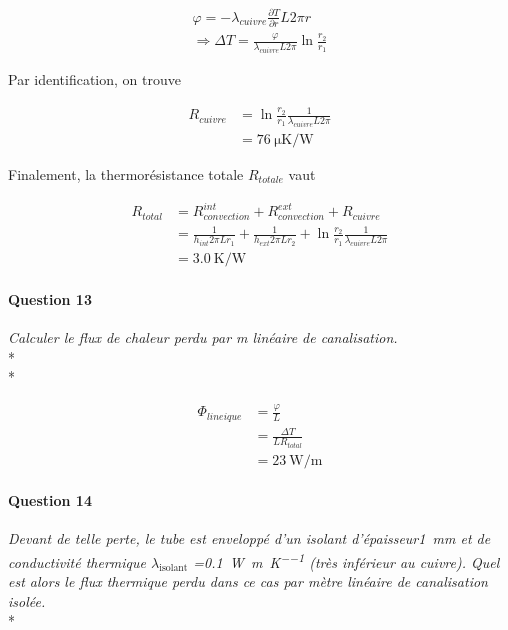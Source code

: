 \documentclass[oneside,a4paper,13pt]{book}
\begin{document}
\begin{gather}
	\varphi  =  -\lambda_{cuivre} \frac{\partial T}{\partial r} L 2\pi r \\
	\Rightarrow \Delta T = \frac{\varphi}{\lambda_{cuivre}L2\pi} \ln{\frac{r_{2}}{r_{1}}}
\end{gather}

Par identification, on trouve

\begin{equation} \label{eq15}
\begin{split}
	R_{cuivre} & = \ln{\frac{r_{2}}{r_{1}}}\frac{1}{\lambda_{cuivre}L2\pi} \\
	& = \SI{76}{\micro\kelvin\per\watt}
\end{split}
\end{equation}

Finalement, la thermorésistance totale $R_{totale}$ vaut

\begin{equation} \label{eq12}
\begin{split}
	R_{total} & = R_{convection}^{int} + R_{convection}^{ext} + R_{cuivre} \\
	& = \frac{1}{h_{int}2 \pi L r_{1}} + \frac{1}{h_{ext}2 \pi L r_{2}} +  \ln{\frac{r_{2}}{r_{1}}}\frac{1}{\lambda_{cuivre}L2\pi} \\
	& = \SI{3.0}{\kelvin\per\watt}
\end{split}
\end{equation}

\paragraph{Question 13} 
\textit{ Calculer le flux de chaleur perdu par m linéaire de canalisation.} \\* \\*

\begin{equation} \label{eq17}
\begin{split}
	\Phi_{lineique} & = \frac{\varphi}{L} \\
	& = \frac{\Delta T}{L R_{total}} \\
	& = \SI{23}{\watt\per\meter}
\end{split}
\end{equation}

\paragraph{Question 14} 
\textit{ Devant de telle perte, le tube est enveloppé d’un isolant d’épaisseur\SI{1}{ \milli\meter} et de conductivité thermique $\lambda_{\mathrm{isolant}}$ =\SI{0.1}{\watt\per\meter\per\kelvin} (très inférieur au cuivre). Quel est alors le flux thermique perdu dans ce cas par mètre linéaire de canalisation isolée.} \\*
\end{document}
